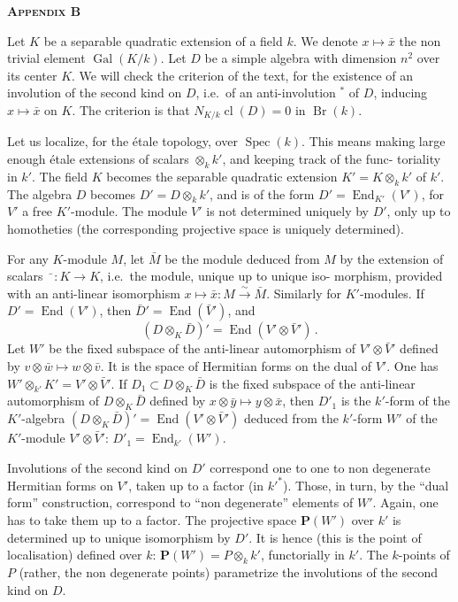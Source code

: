 \documentclass[12pt,a4paper]{article}
\theoremstyle{plain}
\theoremstyle{remark}
\DeclareMathOperator{\Gal}{Gal}
\DeclareMathOperator{\End}{End}
\DeclareMathOperator{\Br}{Br}
\DeclareMathOperator{\Spec}{Spec}
\DeclareMathOperator{\cl}{cl}
\begin{document}
\vspace{0.5cm}
\begin{center}
\textbf{\textsc{Appendix B}}
\end{center}
\vspace{0.3cm}

Let $K$ be a separable quadratic extension of a field $k$. We denote $x \mapsto \bar{x}$
the non trivial element $\Gal(K/k)$. Let $D$ be a simple algebra with dimension
$n^2$ over its center $K$. We will check the criterion of the text, for the existence
of an involution of the second kind on $D$, i.e.\ of an anti-involution ${}^*$ of $D$,
inducing $x \mapsto \bar{x}$ on $K$. The criterion is that $N_{K/k} \cl(D) = 0$ in $\Br(k)$.

Let us localize, for the \'{e}tale topology, over $\Spec(k)$. This means making
large enough \'{e}tale extensions of scalars $\otimes_k k'$, and keeping track of the func-
toriality in $k'$. The field $K$ becomes the separable quadratic extension
$K' = K \otimes_k k'$ of $k'$. The algebra $D$ becomes $D' = D \otimes_k k'$, and is of the form
$D' = \End_{K'}(V')$, for $V'$ a free $K'$-module. The module $V'$ is not determined
uniquely by $D'$, only up to homotheties (the corresponding projective space is
uniquely determined).

For any $K$-module $M$, let $\bar{M}$ be the module deduced from $M$ by the
extension of scalars $\bar{\phantom{x}} : K \to K$, i.e.\ the module, unique up to unique iso-
morphism, provided with an anti-linear isomorphism $x \mapsto \bar{x} : M \xrightarrow{\sim} \bar{M}$.
Similarly for $K'$-modules. If $D' = \End(V')$, then $\bar{D}{}' = \End(\bar{V}{}')$, and
\[
(D \otimes_K \bar{D})' = \End(V' \otimes \bar{V}{}')\,.
\]
Let $W'$ be the fixed subspace of the anti-linear automorphism of $V' \otimes \bar{V}{}'$
defined by $v \otimes \bar{w} \mapsto w \otimes \bar{v}$. It is the space of Hermitian forms on the dual of
$V'$. One has $W' \otimes_{k'} K' = V' \otimes \bar{V}{}'$. If $D_1 \subset D \otimes_K \bar{D}$ is the fixed subspace
of the anti-linear automorphism of $D \otimes_K \bar{D}$ defined by $x \otimes \bar{y} \mapsto y \otimes \bar{x}$, then
$D'_1$ is the $k'$-form of the $K'$-algebra $(D \otimes_K \bar{D})' = \End(V' \otimes \bar{V}{}')$ deduced from
the $k'$-form $W'$ of the $K'$-module $V' \otimes \bar{V}{}'$: $D'_1 = \End_{k'}(W')$.

Involutions of the second kind on $D'$ correspond one to one to non
degenerate Hermitian forms on $V'$, taken up to a factor (in $k'^*$). Those, in turn,
by the ``dual form'' construction, correspond to ``non degenerate'' elements of
$W'$. Again, one has to take them up to a factor. The projective space $\mathbf{P}(W')$
over $k'$ is determined up to unique isomorphism by $D'$. It is hence (this is the
point of localisation) defined over $k$: $\mathbf{P}(W') = P \otimes_k k'$, functorially in $k'$. The
$k$-points of $P$ (rather, the non degenerate points) parametrize the involutions
of the second kind on $D$.
\end{document}
